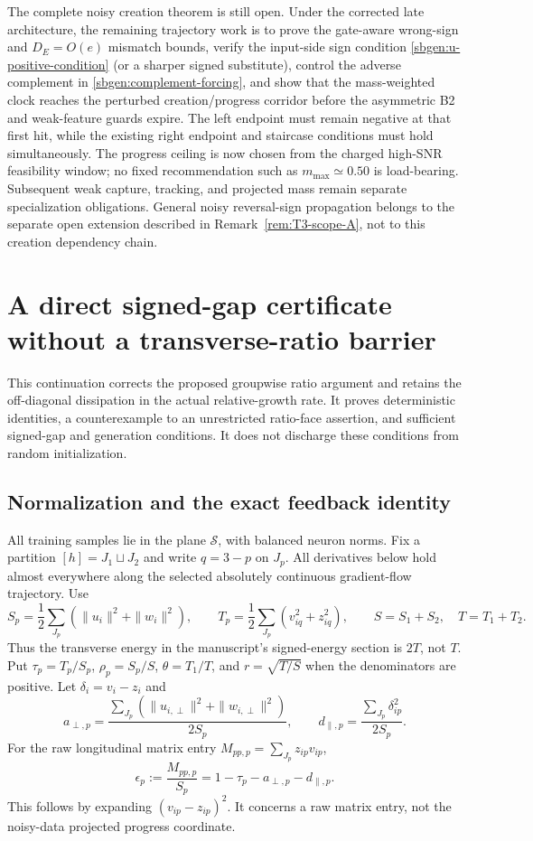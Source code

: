 \documentclass{article} %
\theoremstyle{plain}
\theoremstyle{definition}
\theoremstyle{remark}
\begin{document}
The complete noisy creation theorem is still open.  Under the corrected late
architecture, the remaining trajectory work is to prove the gate-aware
wrong-sign and $D_E=O(e)$ mismatch bounds, verify the input-side sign condition
\eqref{sbgen:u-positive-condition} (or a sharper signed substitute), control
the adverse complement in \eqref{sbgen:complement-forcing}, and show that the
mass-weighted clock reaches the perturbed creation/progress corridor before
the asymmetric B2 and weak-feature guards expire.
The left endpoint must remain negative at that first hit, while the existing
right endpoint and staircase conditions must hold simultaneously.  The
progress ceiling is now chosen from the charged high-SNR feasibility window;
no fixed recommendation such as $m_{\max}\simeq0.50$ is load-bearing.
Subsequent weak capture, tracking, and projected mass remain separate
specialization obligations.  General noisy reversal-sign propagation belongs
to the separate open extension described in
Remark~\ref{rem:T3-scope-A}, not to this creation dependency chain.


\section{A direct signed-gap certificate without a transverse-ratio barrier}
\label{sbgap:scope}

This continuation corrects the proposed groupwise ratio argument and
retains the off-diagonal dissipation in the actual relative-growth rate.
It proves deterministic identities, a counterexample to an unrestricted
ratio-face assertion, and sufficient signed-gap and generation conditions.
It does not discharge these conditions from random initialization.

\subsection{Normalization and the exact feedback identity}

All training samples lie in the plane $\mathcal S$, with balanced neuron
norms. Fix a partition $[h]=J_1\sqcup J_2$ and write $q=3-p$ on $J_p$.
All derivatives below hold almost everywhere along the selected absolutely
continuous gradient-flow trajectory. Use
\[
 S_p=\frac12\sum_{J_p}(\|u_i\|^2+\|w_i\|^2),\qquad
 T_p=\frac12\sum_{J_p}(v_{iq}^2+z_{iq}^2),\qquad
 S=S_1+S_2,\quad T=T_1+T_2.
\]
Thus the transverse energy in the manuscript's signed-energy section is
$2T$, not $T$. Put $\tau_p=T_p/S_p$, $\rho_p=S_p/S$,
$\theta=T_1/T$, and $r=\sqrt{T/S}$ when the denominators are positive.
Let $\delta_i=v_i-z_i$ and
\[
 a_{\perp,p}=\frac{\sum_{J_p}(\|u_{i,\perp}\|^2+
                  \|w_{i,\perp}\|^2)}{2S_p},\qquad
 d_{\parallel,p}=\frac{\sum_{J_p}\delta_{ip}^2}{2S_p}.
\]
For the raw longitudinal matrix entry $M_{pp,p}=\sum_{J_p}z_{ip}v_{ip}$,
\begin{equation}\label{sbgap:efficiency}
 \epsilon_p:=\frac{M_{pp,p}}{S_p}
       =1-\tau_p-a_{\perp,p}-d_{\parallel,p}.
\end{equation}
This follows by expanding $(v_{ip}-z_{ip})^2$. It concerns a raw matrix
entry, not the noisy-data projected progress coordinate.
\end{document}
